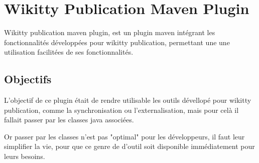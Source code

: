 

\section{Wikitty Publication Maven Plugin}

Wikitty publication maven plugin, est un plugin maven intégrant les 
fonctionnalités développées pour wikitty publication, permettant une une
utilisation facilitées de ses fonctionnalités.

\subsection{Objectifs}

L'objectif de ce plugin était de rendre utilisable les outils dévellopé pour 
wikitty publication, comme la synchronisation ou l'externalisation, mais 
pour celà il fallait passer par les classes java associées. 

Or passer par les classes n'est pas "optimal" pour les développeurs, il faut
leur simplifier la vie, pour que ce genre de d'outil soit disponible 
immédiatement pour leurs besoins.

